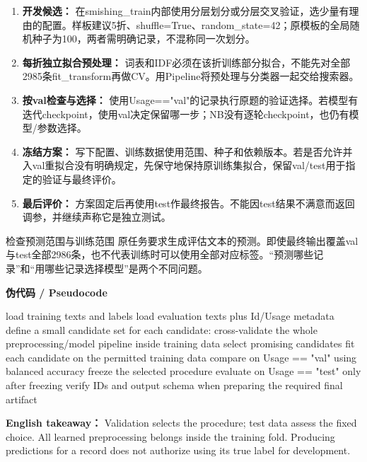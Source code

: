 \begin{enumerate}[start=1]

\item \textbf{开发候选：} 在smishing\_train内部使用分层划分或分层交叉验证，选少量有理由的配置。样板建议5折、shuffle=True、random\_state=42；原模板的全局随机种子为100，两者需明确记录，不混称同一次划分。

\item \textbf{每折独立拟合预处理：} 词表和IDF必须在该折训练部分拟合，不能先对全部2985条fit\_transform再做CV。用Pipeline将预处理与分类器一起交给搜索器。

\item \textbf{按val检查与选择：} 使用Usage=="val"的记录执行原题的验证选择。若模型有迭代checkpoint，使用val决定保留哪一步；NB没有逐轮checkpoint，也仍有模型/参数选择。

\item \textbf{冻结方案：} 写下配置、训练数据使用范围、种子和依赖版本。若是否允许并入val重拟合没有明确规定，先保守地保持原训练集拟合，保留val/test用于指定的验证与最终评价。

\item \textbf{最后评价：} 方案固定后再使用test作最终报告。不能因test结果不满意而返回调参，并继续声称它是独立测试。

\end{enumerate}


\begin{StudyBlock}{检查}{预测范围与训练范围}
原任务要求生成评估文本的预测。即使最终输出覆盖val与test全部2986条，也不代表训练时可以使用全部对应标签。“预测哪些记录”和“用哪些记录选择模型”是两个不同问题。
\end{StudyBlock}


\textbf{伪代码 / Pseudocode}



\begin{StudyCode}
load training texts and labels
load evaluation texts plus Id/Usage metadata
define a small candidate set
for each candidate:
    cross-validate the whole preprocessing/model pipeline inside training data
select promising candidates
fit each candidate on the permitted training data
compare on Usage == "val" using balanced accuracy
freeze the selected procedure
evaluate on Usage == "test" only after freezing
verify IDs and output schema when preparing the required final artifact
\end{StudyCode}


\textbf{English takeaway：} Validation selects the procedure; test data assess the fixed choice. All learned preprocessing belongs inside the training fold. Producing predictions for a record does not authorize using its true label for development.


